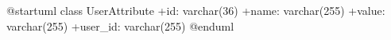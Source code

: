 \begin{plantuml}

@startuml
class UserAttribute {
    +id: varchar(36)
    +name: varchar(255)
    +value: varchar(255)
    +user_id: varchar(255)
}
@enduml

\end{plantuml}

